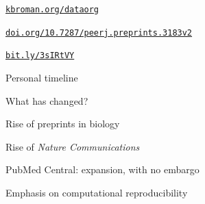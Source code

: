 \documentclass[aspectratio=169,12pt,t]{beamer}
\begin{document}
\begin{frame}[c]{}

  \note{
  }
\end{frame}



\begin{frame}[c]{}
  \vspace{8pt}

  \centerline{}

  \vfill
  \hfill
  \href{https://kbroman.org/dataorg}{\tt \footnotesize \lolit kbroman.org/dataorg}

  \note{
  }
\end{frame}


\begin{frame}[c]{}
  \vspace{8pt}

  \centerline{}

  \vfill
  \hfill
  \href{https://doi.org/10.7287/peerj.preprints.3183v2}{\tt \footnotesize \lolit doi.org/10.7287/peerj.preprints.3183v2}

  \note{
  }
\end{frame}


\begin{frame}[c]{}

  \note{
  }
\end{frame}


\begin{frame}[c]{}
  \vspace{8pt}

  \centerline{}

  \vfill
  \hfill
  \href{https://bit.ly/3sIRtVY}{\tt \footnotesize \lolit bit.ly/3sIRtVY}

  \note{
  }
\end{frame}


\begin{frame}[c]{Personal timeline}


  \note{
  }
\end{frame}


\begin{frame}{What has changed?}

  \bbi
\item Rise of preprints in biology
\item Rise of \emph{Nature Communications}
\item PubMed Central: expansion, with no embargo
\item Emphasis on computational reproducibility
  \ei

  \note{
  }
\end{frame}
\end{document}

